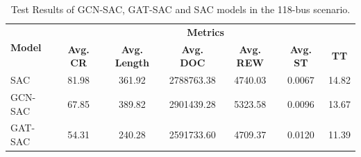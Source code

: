 \begin{table}[H]
	\centering
	\caption{Test Results of GCN-SAC, GAT-SAC and SAC models in the 118-bus scenario.}
	\begin{tabular}{lcccccc}
		\toprule
		\multirow{2}{*}{\textbf{Model}} & \multicolumn{6}{c}{\textbf{Metrics}} \\ 
		\cmidrule(lr){2-7}
		&  \textbf{Avg. CR} & \textbf{Avg. Length} & \textbf{Avg. DOC} & \textbf{Avg. REW} & \textbf{Avg. ST} & \textbf{TT} \\ 
		\midrule
		SAC & 81.98 & 361.92 & 2788763.38 & 4740.03 & 0.0067 & 14.82 \\
		GCN-SAC & 67.85 & 389.82 & 2901439.28 & 5323.58 & 0.0096 & 13.67 \\
		GAT-SAC & 54.31 & 240.28 & 2591733.60 & 4709.37 & 0.0120 & 11.39 \\
		\bottomrule
	\end{tabular}
	\label{tab:test-1182}
\end{table}
	